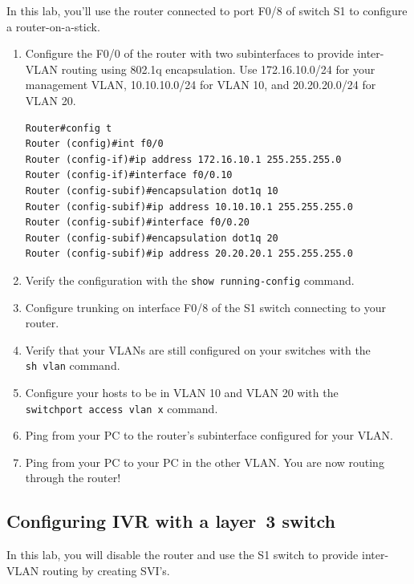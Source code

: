 In this lab, you'll use the router connected to port F0/8 of switch S1
to configure a router-on-a-stick.

\begin{enumerate}
\item
  Configure the F0/0 of the router with two subinterfaces to provide
  inter-VLAN routing using 802.1q encapsulation. Use 172.16.10.0/24 for
  your management VLAN, 10.10.10.0/24 for VLAN 10, and 20.20.20.0/24 for
  VLAN 20.

\begin{verbatim}
Router#config t
Router (config)#int f0/0
Router (config-if)#ip address 172.16.10.1 255.255.255.0
Router (config-if)#interface f0/0.10
Router (config-subif)#encapsulation dot1q 10
Router (config-subif)#ip address 10.10.10.1 255.255.255.0
Router (config-subif)#interface f0/0.20
Router (config-subif)#encapsulation dot1q 20
Router (config-subif)#ip address 20.20.20.1 255.255.255.0
\end{verbatim}
\item
  Verify the configuration with the \texttt{show\ running-config}
  command.
\item
  Configure trunking on interface F0/8 of the S1 switch connecting to
  your router.
\item
  Verify that your VLANs are still configured on your switches with the
  \texttt{sh\ vlan} command.
\item
  Configure your hosts to be in VLAN 10 and VLAN 20 with the
  \texttt{switchport\ access\ vlan\ x} command.
\item
  Ping from your PC to the router's subinterface configured for your
  VLAN.
\item
  Ping from your PC to your PC in the other VLAN. You are now routing
  through the router!
\end{enumerate}

\subsection{Configuring IVR with a layer~3 switch}

In this lab, you will disable the router and use the S1 switch to
provide inter-VLAN routing by creating SVI's.

